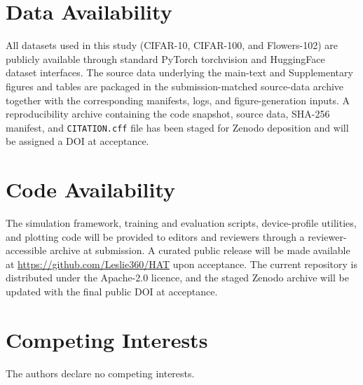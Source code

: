 \section*{Data Availability}
All datasets used in this study (CIFAR-10, CIFAR-100, and Flowers-102) are publicly available through standard PyTorch torchvision and HuggingFace dataset interfaces. The source data underlying the main-text and Supplementary figures and tables are packaged in the submission-matched source-data archive together with the corresponding manifests, logs, and figure-generation inputs. A reproducibility archive containing the code snapshot, source data, SHA-256 manifest, and \texttt{CITATION.cff} file has been staged for Zenodo deposition and will be assigned a DOI at acceptance.

\section*{Code Availability}
The simulation framework, training and evaluation scripts, device-profile utilities, and plotting code will be provided to editors and reviewers through a reviewer-accessible archive at submission. A curated public release will be made available at \url{https://github.com/Leslie360/HAT} upon acceptance. The current repository is distributed under the Apache-2.0 licence, and the staged Zenodo archive will be updated with the final public DOI at acceptance.

\section*{Competing Interests}
The authors declare no competing interests.
